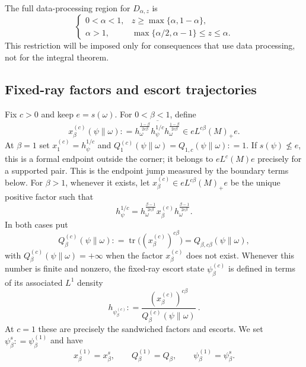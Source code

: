 \documentclass[12pt]{article}
\numberwithin{equation}{section}
\theoremstyle{definition}
\theoremstyle{remark}
\newcommand{\?}{\overset{?}{=}}
\newcommand{\defeq}{\mathrel{\mathop:}=}
\DeclareMathOperator{\tr}{tr}
\begin{document}
The full data-processing region for $D_{\alpha,z}$ is \cite{Zhang:2018roy, Hiai:2024qve}
\begin{equation}
  \begin{cases}
  0<\alpha<1,
  &z\geq\max\{\alpha,1-\alpha\},\\[0.4ex]
  \alpha>1,
  &\max\{\alpha/2,\alpha-1\}\leq z\leq\alpha.
  \end{cases}
  \label{eq:dpi-region}
\end{equation}
This restriction will be imposed only for
consequences that use data processing, not for the integral theorem.

\subsection{Fixed-ray factors and escort trajectories}
\label{subsec:algebraic-ray-escorts}

Fix $c>0$ and keep $e=s(\omega)$.  For $0<\beta<1$, define
\begin{equation}
  x_\beta^{(c)}(\psi\|\omega)
  \defeq \overline{
  h_\omega^{\frac{1-\beta}{2c\beta}}
  h_\psi^{1/c}
  h_\omega^{\frac{1-\beta}{2c\beta}}}
  \in eL^{c\beta}(M)_+e.
  \label{eq:lower-fixed-ray-factor}
\end{equation}
At $\beta=1$ set
$x_1^{(c)}=h_\psi^{1/c}$ and
$Q_1^{(c)}(\psi\|\omega)=Q_{1,c}(\psi\|\omega)\defeq 1$.  If
$s(\psi)\nleq e$, this is a formal endpoint outside the corner; it belongs
to $eL^c(M)e$ precisely for a supported pair.  This is the endpoint jump
measured by the boundary terms below.  
For $\beta>1$, whenever it exists, let
$x_\beta^{(c)}\in eL^{c\beta}(M)_+e$ be the unique positive factor such that
\begin{equation}
  h_\psi^{1/c}
  =h_\omega^{\frac{\beta-1}{2c\beta}}
   x_\beta^{(c)}
   h_\omega^{\frac{\beta-1}{2c\beta}}.
  \label{eq:upper-fixed-ray-factor}
\end{equation}
In both cases put
\begin{equation}
  Q_\beta^{(c)}(\psi\|\omega)
  \defeq \tr\bigl((x_\beta^{(c)})^{c\beta}\bigr)
  =Q_{\beta,c\beta}(\psi\|\omega),
  \label{eq:algebraic-ray-moment}
\end{equation}
with $ Q_\beta^{(c)}(\psi\|\omega)=+\infty$ when the factor $x_\beta^{(c)}$ does not exist.
Whenever this number is finite and nonzero, the fixed-ray escort state $\psi_\beta^{(c)}$ is defined in terms of its associated $L^1$ density
\begin{equation}
  h_{\psi_\beta^{(c)}}
  \defeq \frac{(x_\beta^{(c)})^{c\beta}}
          {Q_\beta^{(c)}(\psi\|\omega)} \ .
  \label{eq:algebraic-ray-escort}
\end{equation}
At $c=1$ these are precisely the sandwiched factors and escorts.  We set
$\psi_\beta^s\defeq \psi_\beta^{(1)}$ and have
\begin{equation}
  x_\beta^{(1)}=x_\beta^s,
  \qquad
  Q_\beta^{(1)}=Q_\beta,
  \qquad \psi_\beta^{(1)}=\psi_\beta^s.
  \label{eq:sandwiched-ray-specialization}
\end{equation}
\end{document}
